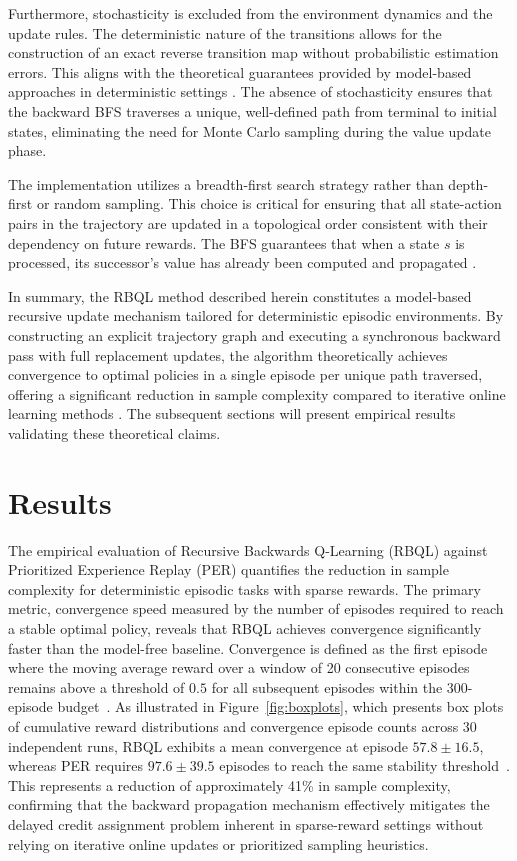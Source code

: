 \documentclass[manuscript, screen, review]{jair}
\begin{document}
Furthermore, stochasticity is excluded from the environment dynamics and the update rules. The deterministic nature of the transitions allows for the construction of an exact reverse transition map without probabilistic estimation errors. This aligns with the theoretical guarantees provided by model-based approaches in deterministic settings \cite{Diekhoff2024RecursiveBQ}. The absence of stochasticity ensures that the backward BFS traverses a unique, well-defined path from terminal to initial states, eliminating the need for Monte Carlo sampling during the value update phase.

The implementation utilizes a breadth-first search strategy rather than depth-first or random sampling. This choice is critical for ensuring that all state-action pairs in the trajectory are updated in a topological order consistent with their dependency on future rewards. The BFS guarantees that when a state $s$ is processed, its successor's value has already been computed and propagated \cite{Hong2022TopologicalER}.

In summary, the RBQL method described herein constitutes a model-based recursive update mechanism tailored for deterministic episodic environments. By constructing an explicit trajectory graph and executing a synchronous backward pass with full replacement updates, the algorithm theoretically achieves convergence to optimal policies in a single episode per unique path traversed, offering a significant reduction in sample complexity compared to iterative online learning methods \cite{Lee2018SampleEfficientDR}. The subsequent sections will present empirical results validating these theoretical claims.

\section{Results}
The empirical evaluation of Recursive Backwards Q-Learning (RBQL) against Prioritized Experience Replay (PER) quantifies the reduction in sample complexity for deterministic episodic tasks with sparse rewards. The primary metric, convergence speed measured by the number of episodes required to reach a stable optimal policy, reveals that RBQL achieves convergence significantly faster than the model-free baseline. Convergence is defined as the first episode where the moving average reward over a window of 20 consecutive episodes remains above a threshold of $0.5$ for all subsequent episodes within the 300-episode budget~\cite{Lee2018SampleEfficientDR}. As illustrated in Figure~\ref{fig:boxplots}, which presents box plots of cumulative reward distributions and convergence episode counts across 30 independent runs, RBQL exhibits a mean convergence at episode $57.8 \pm 16.5$, whereas PER requires $97.6 \pm 39.5$ episodes to reach the same stability threshold~\cite{Lee2018SampleEfficientDR}. This represents a reduction of approximately 41\% in sample complexity, confirming that the backward propagation mechanism effectively mitigates the delayed credit assignment problem inherent in sparse-reward settings without relying on iterative online updates or prioritized sampling heuristics.
\end{document}

